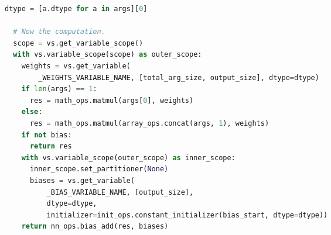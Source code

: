 \begin{landscape}
\begin{multicols}{2}
\begin{lstlisting}[language=Python]
  dtype = [a.dtype for a in args][0]

  # Now the computation.
  scope = vs.get_variable_scope()
  with vs.variable_scope(scope) as outer_scope:
    weights = vs.get_variable(
        _WEIGHTS_VARIABLE_NAME, [total_arg_size, output_size], dtype=dtype)
    if len(args) == 1:
      res = math_ops.matmul(args[0], weights)
    else:
      res = math_ops.matmul(array_ops.concat(args, 1), weights)
    if not bias:
      return res
    with vs.variable_scope(outer_scope) as inner_scope:
      inner_scope.set_partitioner(None)
      biases = vs.get_variable(
          _BIAS_VARIABLE_NAME, [output_size],
          dtype=dtype,
          initializer=init_ops.constant_initializer(bias_start, dtype=dtype))
    return nn_ops.bias_add(res, biases)
\end{lstlisting}

\endgroup

\end{multicols}
\end{landscape}
